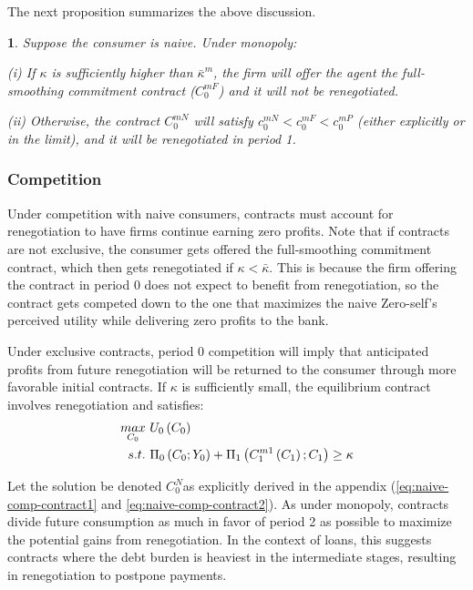 \documentclass[11pt,english]{article}
\theoremstyle{plain}
\newtheorem{prop}{\protect\propositionname}
\theoremstyle{definition}
\providecommand{\propositionname}{Proposition}
\begin{document}
The next proposition summarizes the above discussion. 
\begin{prop}
Suppose the consumer is naive. Under monopoly:

(i) If $\kappa$ is sufficiently higher than $\bar{\kappa}^{m}$,
the firm will offer the agent the full-smoothing commitment contract
($C_{0}^{mF}$) and it will not be renegotiated.

(ii) Otherwise, the contract $C_{0}^{mN}$ will satisfy $c_{0}^{mN}<c_{0}^{mF}<c_{0}^{mP}$
(either explicitly or in the limit), and it will be renegotiated in
period 1. 
\end{prop}

\subsubsection{Competition}

Under competition with naive consumers, contracts must account for
renegotiation to have firms continue earning zero profits. Note that if contracts are not exclusive, the consumer gets offered
the full-smoothing commitment contract, which then gets renegotiated
if $\kappa<\bar{\kappa}$. This is because the firm offering the contract
in period 0 does not expect to benefit from renegotiation, so the
contract gets competed down to the one that maximizes the naive Zero-self's
perceived utility while delivering zero profits to the bank.

Under exclusive contracts, period 0 competition will imply that anticipated profits from future renegotiation
will be returned to the consumer through more favorable initial contracts.
If $\kappa$ is sufficiently small, the equilibrium contract involves
renegotiation and satisfies: 
\begin{align}
\underset{C_{0}}{\mbox{\ensuremath{max}}} & \ U_{0}\left(C_{0}\right)\\
s.t. & \ \Pi_{0}\left(C_{0};Y_{0}\right)+\Pi_{1}\left(C_{1}^{m1}\left(C_{1}\right);C_{1}\right)\geq\kappa
\end{align}

Let the solution be denoted $C_{0}^{N}$as explicitly derived
in the appendix (\ref{eq:naive-comp-contract1} and \ref{eq:naive-comp-contract2}).
As under monopoly, contracts divide future consumption as much in
favor of period 2 as possible to maximize the potential gains
from renegotiation. In the context of loans, this suggests contracts
where the debt burden is heaviest in the intermediate stages, resulting
in renegotiation to postpone payments.
\end{document}
